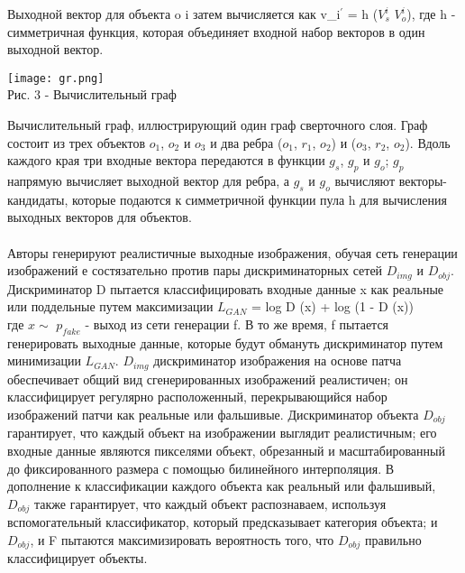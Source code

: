 \documentclass{article}
\begin{document}
Выходной вектор для объекта o i затем вычисляется как
$ $v_{i}$^\prime$ = h ($V^i_{s} $ \bigcup  $V^i_{o} $), где h - симметричная функция, которая
объединяет входной набор векторов в один выходной вектор.\\
  \begin{center} 
  \texttt{[image: gr.png]}
  \\
  \caption*{Рис. 3 - Вычислительный граф}
  \end{center} 
  \large Вычислительный граф, иллюстрирующий один граф сверточного слоя. Граф состоит из трех объектов $o_{1}$, $o_{2}$ и $o_{3}$ и
два ребра ($o_{1}$, $r_{1}$, $o_{2}$) и ($o_{3}$, $r_{2}$, $o_{2}$). Вдоль каждого края три
входные вектора передаются в функции $g_{s}$, $g_{p}$ и $g_{o}$; $g_{p}$ напрямую
вычисляет выходной вектор для ребра, а $g_{s}$ и $g_{o}$ вычисляют
векторы-кандидаты, которые подаются к симметричной функции пула
h для вычисления выходных векторов для объектов.\\ \\
Авторы генерируют реалистичные выходные изображения,
обучая сеть генерации изображений е состязательно
против пары дискриминаторных сетей $D_{img}$ и $D_{obj}$.
Дискриминатор D пытается классифицировать входные данные x как реальные
или поддельные путем максимизации $L_{GAN}$ =  log D (x) +  log (1 - D (x))\\
где $x\sim$ $p_{fake}$ - выход из сети генерации f.
В то же время, f пытается генерировать выходные данные, которые будут
обмануть дискриминатор путем минимизации $L_{GAN}$.
$D_{img}$ дискриминатор изображения на основе патча обеспечивает
общий вид сгенерированных изображений реалистичен;
он классифицирует регулярно расположенный, перекрывающийся набор изображений
патчи как реальные или фальшивые.
Дискриминатор объекта $D_{obj}$ гарантирует, что каждый объект
на изображении выглядит реалистичным; его входные данные являются пикселями
объект, обрезанный и масштабированный до фиксированного размера с помощью билинейного
интерполяция. В дополнение к классификации каждого объекта как
реальный или фальшивый, $D_{obj}$ также гарантирует, что каждый объект распознаваем, используя вспомогательный классификатор, который предсказывает
категория объекта; и $D_{obj}$, и F пытаются максимизировать
вероятность того, что $D_{obj}$ правильно классифицирует объекты.\\ \\
\end{document}
